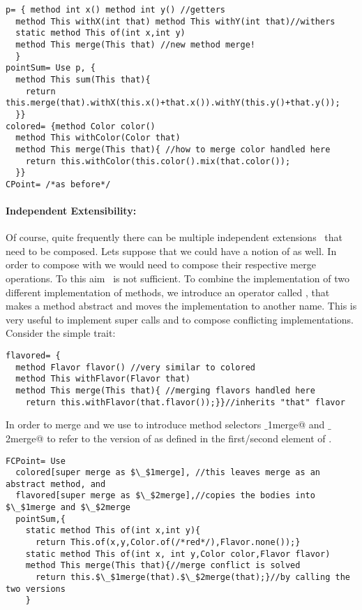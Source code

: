  \begin{lstlisting}
p= { method int x() method int y() //getters
  method This withX(int that) method This withY(int that)//withers
  static method This of(int x,int y)
  method This merge(This that) //new method merge!
  }
pointSum= Use p, { 
  method This sum(This that){
    return this.merge(that).withX(this.x()+that.x()).withY(this.y()+that.y());
  }}
colored= {method Color color()
  method This withColor(Color that)
  method This merge(This that){ //how to merge color handled here
    return this.withColor(this.color().mix(that.color());
  }}
CPoint= /*as before*/
\end{lstlisting}  

\paragraph{Independent Extensibility:}
  Of course, quite frequently there can be multiple independent
  extensions~\cite{Zenger-Odersky2005} that need to be composed. Lets suppose that 
  we could have a notion of \Q@flavored@ as well.   
  In order to compose \Q@colored@ with \Q@flavored@ we would
  need to compose their respective merge operations. To this aim \use\ is not sufficient. To combine the implementation of two different implementation of methods, we introduce an operator called \Q@super@, that
 makes a method abstract and
moves the implementation to another name. This is very useful to implement super calls
 and to compose conflicting implementations.
\noindent Consider the simple \Q@flavored@ trait:
 \begin{lstlisting}
flavored= {
  method Flavor flavor() //very similar to colored
  method This withFlavor(Flavor that)
  method This merge(This that){ //merging flavors handled here
    return this.withFlavor(that.flavor());}}//inherits "that" flavor
\end{lstlisting}  

\noindent In order to merge \Q@colored@ and \Q@flavored@ we use  \Q@super@ to introduce method selectors \Q@$\_$1merge@ and \Q@$\_$2merge@
to refer to the version of \Q@merge@ as defined in the first/second element of \use.

 \begin{lstlisting}
FCPoint= Use
  colored[super merge as $\_$1merge], //this leaves merge as an abstract method, and
  flavored[super merge as $\_$2merge],//copies the bodies into $\_$1merge and $\_$2merge
  pointSum,{
    static method This of(int x,int y){
      return This.of(x,y,Color.of(/*red*/),Flavor.none());}
    static method This of(int x, int y,Color color,Flavor flavor)
    method This merge(This that){//merge conflict is solved 
      return this.$\_$1merge(that).$\_$2merge(that);}//by calling the two versions
    }
\end{lstlisting}  

